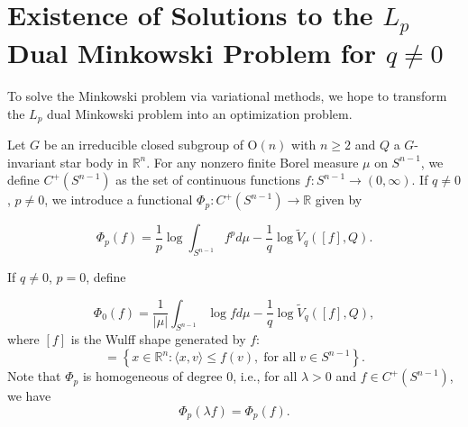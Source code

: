 \documentclass[12pt, reqno]{amsart}
\newtheorem{lemma}[theorem]{Lemma}
\theoremstyle{definition}
\theoremstyle{remark}
\numberwithin{equation}{section}
\newcommand{\R}{\mathbb{R}}
\newcommand{\Rn}{\mathbb{R}^{n}}
\newcommand{\Sn}{S^{n-1}}
\newcommand{\On}{\mathrm{O}(n)}
\newcommand{\la}{\langle}
\newcommand{\ra}{\rangle}
\begin{document}
	
	
	
	\vspace{1\baselineskip} 
	\section{Existence of Solutions to the $L_{p}$ Dual Minkowski Problem for $q\neq 0$}
	
	

		

	
	
	To solve the Minkowski problem via variational methods,  we hope to transform the $L_{p}$ dual Minkowski problem into an optimization problem.
	
	
		Let $G$ be an irreducible closed subgroup of $\On$ with $n\ge2$ and $Q$ a $G$-invariant star body in $\Rn$.
	For any nonzero finite Borel measure  $\mu$ on $\Sn$,
	we define  $C^{+}(\Sn)$ as the set of continuous functions $f: \Sn \to (0, \infty)$. If $q\neq0$, $p\neq0$, we introduce a functional $\Phi_{p}: C^{+}(\Sn) \to \R$ given by
	
	\begin{equation}\label{def pneq0}
		\Phi_{p}(f) = \frac{1}{p} \log \int_{S^{n-1}} f^{p}  d\mu - \frac{1}{q} \log \widetilde{V}_{q}([f], Q).
	\end{equation}
	
	If $q\neq0$, $p=0$,  define 	
	
	\begin{equation}\label{defp=0}
		\Phi_{0}(f) = \frac{1}{|\mu|} \int _{S^{n-1}}\log f  d\mu - \frac{1}{q} \log \widetilde{V}_{q}([f], Q),
	\end{equation}
	where $ [f] $ is the Wulff shape generated by $ f $:
	\begin{equation}
		[f]=\left\{x\in \mathbb{R}^{n}: \la x, v \ra \le f(v),\; \text{for all}\; v\in S^{n-1}\right\}.
	\end{equation}
	Note that $\Phi_{p}$ is homogeneous of degree $0$, i.e., for all $\lambda >0$ and $f\in C^{+}(\Sn)$, we have 
	\begin{equation}\label{homo}
			\Phi_{p}(\lambda f) = \Phi_{p}(f).
	\end{equation}
	
\end{document}
